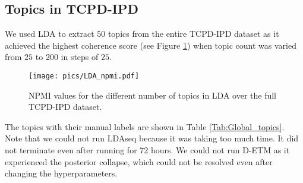 \documentclass[10pt, a4paper]{article}
\begin{document}
\subsection{Topics in TCPD-IPD}
 \label{ap:lda}
 We used LDA to extract $50$ topics from the entire TCPD-IPD dataset as it achieved the highest coherence score (see Figure \ref{fig:LDA_Global_NPMI}) when topic count was varied from $25$ to $200$ in steps of $25$.
 \begin{figure} [htbp]
        \centering
        \texttt{[image: pics/LDA\_npmi.pdf]}
        \captionsetup{justification=centering}
        \caption{NPMI values for the different number of topics in LDA over the full TCPD-IPD dataset.} 
        \label{fig:LDA_Global_NPMI}
\end{figure}
The topics with their manual labels are shown in Table \ref{Tab:Global_topics}. Note that we could not run LDAseq because it was taking too much time. It did not terminate even after running for 72 hours. We could not run D-ETM as it experienced the posterior collapse, which could not be resolved even after changing the hyperparameters. 
\end{document}
